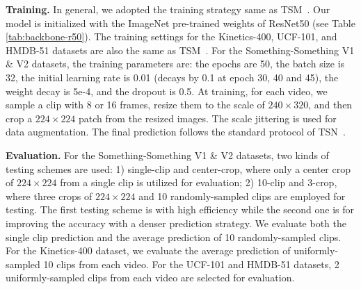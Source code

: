 \documentclass[journal]{IEEEtran}
\begin{document}
\noindent \textbf{Training.} In general, we adopted the training strategy same as TSM~\cite{lin2019tsm}. Our model is initialized with the ImageNet pre-trained weights of ResNet50 (see Table \ref{tab:backbone-r50}). The training settings for the Kinetics-400, UCF-101, and HMDB-51 datasets are also the same as TSM~\cite{lin2019tsm}. For the Something-Something V1 \& V2 datasets, the training parameters are: the epochs are 50, the batch size is 32, the initial learning rate is 0.01 (decays by 0.1 at epoch 30, 40 and 45), the weight decay is 5e-4, and the dropout is 0.5. At training, for each video, we sample a clip with 8 or 16 frames, resize them to the scale of $240 \times 320$, and then crop a $224 \times 224$ patch from the resized images. The scale jittering is used for data augmentation. The final prediction follows the standard protocol of TSN~\cite{wang2016temporal}.

\noindent \textbf{Evaluation.} For the Something-Something V1 \& V2 datasets, two kinds of testing schemes are used: 1) single-clip and center-crop, where only a center crop of $224 \times 224$ from a single clip is utilized for evaluation; 2) 10-clip and 3-crop, where three crops of $224 \times 224$ and 10 randomly-sampled clips are employed for testing. The first testing scheme is with high efficiency while the second one is for improving the accuracy with a denser prediction strategy. We evaluate both the single clip prediction and the average prediction of 10 randomly-sampled clips. For the Kinetics-400 dataset, we evaluate the average prediction of uniformly-sampled 10 clips from each video. For the UCF-101 and HMDB-51 datasets, 2 uniformly-sampled clips from each video are selected for evaluation.
\end{document}
